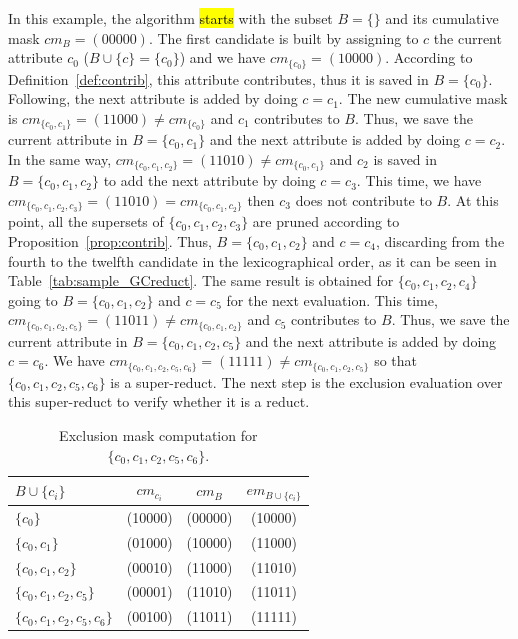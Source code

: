 \documentclass[number,preprint,review,12pt]{elsarticle}
\begin{document}
	\label{par:step}
	In this example, the algorithm \hl{starts} with the subset $B=\lbrace \rbrace$ and its cumulative mask $cm_B=(00000)$. The first candidate is built by assigning to $c$ the current attribute  $c_0$ ($B\cup \lbrace c\rbrace = \lbrace c_0\rbrace$) and we have $cm_{\lbrace c_0\rbrace}=(10000)$. According to Definition~\ref{def:contrib}, this attribute contributes, thus it is saved in $B=\lbrace c_0\rbrace$. Following, the next attribute is added  by doing $c = c_1$. The new cumulative mask is $cm_{\lbrace c_0,c_1\rbrace}=(11000)\neq cm_{\lbrace c_0\rbrace}$ and $c_1$ contributes to $B$. Thus, we save the current attribute in $B = \lbrace c_0,c_1\rbrace$ and the next attribute is added by doing $c = c_2$. In the same way, $cm_{\lbrace c_0,c_1,c_2\rbrace}=(11010)\neq cm_{\lbrace c_0,c_1\rbrace}$ and $c_2$ is saved in $B = \lbrace c_0,c_1,c_2\rbrace$ to add the next attribute by doing $c = c_3$. This time, we have $cm_{\lbrace c_0,c_1,c_2,c_3\rbrace}=(11010) = cm_{\lbrace c_0,c_1,c_2\rbrace}$ then $c_3$ does not contribute to $B$. At this point, all the supersets of $\lbrace c_0,c_1,c_2,c_3\rbrace$ are pruned according to Proposition~\ref{prop:contrib}. Thus, $B = \lbrace c_0,c_1,c_2\rbrace$ and $c = c_4$, discarding from the fourth to the twelfth candidate in the lexicographical order, as it can be seen in  Table~\ref{tab:sample_GCreduct}. The same result is obtained for $\lbrace c_0,c_1,c_2,c_4\rbrace$ going to $B = \lbrace c_0,c_1,c_2\rbrace$ and $c = c_5$ for the next evaluation. This time, $cm_{\lbrace c_0,c_1,c_2,c_5\rbrace}=(11011)\neq cm_{\lbrace c_0,c_1,c_2\rbrace}$ and $c_5$ contributes to $B$. Thus, we save the current attribute in $B = \lbrace c_0,c_1,c_2,c_5\rbrace$ and the next attribute is added by doing $c = c_6$. We have $cm_{\lbrace c_0,c_1,c_2,c_5,c_6\rbrace}=(11111)\neq cm_{\lbrace c_0,c_1,c_2,c_5\rbrace}$ so that $\lbrace c_0,c_1,c_2,c_5,c_6\rbrace$ is a super-reduct. The next step is the exclusion evaluation over this super-reduct to verify whether it is a reduct.
	  
  	\begin{table}[!htb]
  		\caption{Exclusion mask computation for $\lbrace c_0,c_1,c_2,c_5,c_6\rbrace$.}\label{tab:em}
  		\centering 
  		\begin{tabular}{|l|c|c|c|}
  			\hline
  			$B\cup \lbrace c_i\rbrace$                          & $cm_{c_i}$ & $cm_B$  & $em_{B\cup \lbrace c_i\rbrace}$ \\
  			\hline
  			$\lbrace c_0\rbrace$                 & (10000)    & (00000) & (10000)          \\
  			$\lbrace c_0,c_1\rbrace$             & (01000)    & (10000) & (11000)          \\
  			$\lbrace c_0,c_1,c_2\rbrace$         & (00010)    & (11000) & (11010)          \\
  			$\lbrace c_0,c_1,c_2,c_5\rbrace$     & (00001)    & (11010) & (11011)          \\
  			$\lbrace c_0,c_1,c_2,c_5,c_6\rbrace$ & (00100)    & (11011) & (11111)          \\
  			\hline
  		\end{tabular}
  	\end{table}
	  	
\end{document}
